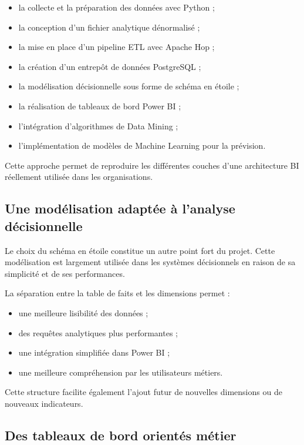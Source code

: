 \documentclass[12pt,a4paper,twoside]{report}
\begin{document}
\begin{itemize}
    \item la collecte et la préparation des données avec Python ;
    \item la conception d'un fichier analytique dénormalisé ;
    \item la mise en place d'un pipeline ETL avec Apache Hop ;
    \item la création d'un entrepôt de données PostgreSQL ;
    \item la modélisation décisionnelle sous forme de schéma en étoile ;
    \item la réalisation de tableaux de bord Power BI ;
    \item l'intégration d'algorithmes de Data Mining ;
    \item l'implémentation de modèles de Machine Learning pour la prévision.
\end{itemize}

Cette approche permet de reproduire les différentes couches d'une architecture BI réellement utilisée dans les organisations.

\subsection{Une modélisation adaptée à l'analyse décisionnelle}

Le choix du schéma en étoile constitue un autre point fort du projet. Cette modélisation est largement utilisée dans les systèmes décisionnels en raison de sa simplicité et de ses performances.

La séparation entre la table de faits et les dimensions permet :

\begin{itemize}
    \item une meilleure lisibilité des données ;
    \item des requêtes analytiques plus performantes ;
    \item une intégration simplifiée dans Power BI ;
    \item une meilleure compréhension par les utilisateurs métiers.
\end{itemize}

Cette structure facilite également l'ajout futur de nouvelles dimensions ou de nouveaux indicateurs.

\subsection{Des tableaux de bord orientés métier}
\end{document}
